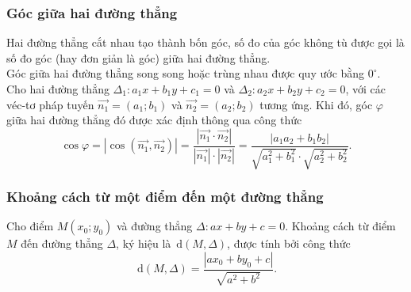 \subsubsection{Góc giữa hai đường thẳng}
	Hai đường thẳng cắt nhau tạo thành bốn góc, số đo của góc không tù được gọi là số đo góc (hay đơn giản là góc) giữa hai đường thẳng.\\
	Góc giữa hai đường thẳng song song hoặc trùng nhau được quy ước bằng $0^\circ$.\\
	Cho hai đường thẳng $\Delta_1\colon a_1 x+b_1y+c_1=0$ và $\Delta_2 \colon a_2 x+b_2y+c_2=0$, với các véc-tơ pháp tuyến $\overrightarrow{n_1}=(a_1;b_1)$ và $\overrightarrow{n_2}=(a_2;b_2)$ tương ứng. Khi đó, góc $\varphi$ giữa hai đường thẳng đó được xác định thông qua công thức $$\cos\varphi=\left|\cos\left(\overrightarrow{n_1},\overrightarrow{n_2}\right)\right|=\dfrac{\left|\overrightarrow{n_1}\cdot \overrightarrow{n_2}\right|}{\left|\overrightarrow{n_1}\right|\cdot \left|\overrightarrow{n_2}\right|}=\dfrac{\left|a_1a_2+b_1b_2\right|}{\sqrt{a_1^2+b_1^2}\cdot \sqrt{a_2^2+b_2^2}}.$$
\subsubsection{Khoảng cách từ một điểm đến một đường thẳng}	
	Cho điểm $M(x_0;y_0)$ và đường thẳng $\Delta \colon ax+by+c=0$. Khoảng cách từ điểm $M$ đến đường thẳng $\Delta$, ký hiệu là $\mathrm{\,d}(M,\Delta)$, được tính bởi công thức $$\mathrm{\,d}(M,\Delta)=\dfrac{\left|ax_0+by_0+c\right|}{\sqrt{a^2+b^2}}.$$

